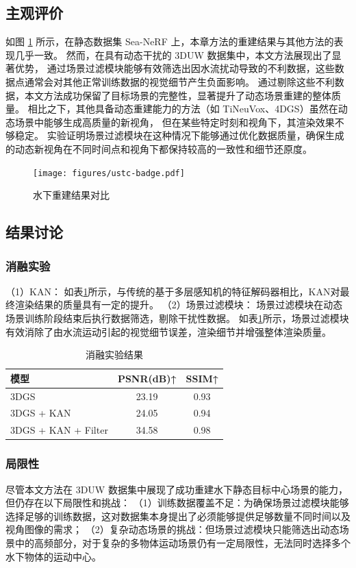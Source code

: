 \subsection{主观评价}
如图 \ref{img:res_3duw} 所示，在静态数据集 Sea-NeRF 上，本章方法的重建结果与其他方法的表现几乎一致。
然而，在具有动态干扰的 3DUW 数据集中，本文方法展现出了显著优势，
通过场景过滤模块能够有效筛选出因水流扰动导致的不利数据，这些数据点通常会对其他正常训练数据的视觉细节产生负面影响。
通过剔除这些不利数据，本文方法成功保留了目标场景的完整性，显著提升了动态场景重建的整体质量。
相比之下，其他具备动态重建能力的方法（如 TiNeuVox\cite{tineuvox}、4DGS\cite{4DGS}）虽然在动态场景中能够生成高质量的新视角，
但在某些特定时刻和视角下，其渲染效果不够稳定。
实验证明场景过滤模块在这种情况下能够通过优化数据质量，确保生成的动态新视角在不同时间点和视角下都保持较高的一致性和细节还原度。
\begin{figure}[htbp]
    \centering
    \texttt{[image: figures/ustc-badge.pdf]}
    \caption{水下重建结果对比}
    \label{img:res_3duw}
\end{figure}

\subsection{结果讨论}
\subsubsection{消融实验}
（1）KAN：
如表\ref{tab:recon_ablation}所示，与传统的基于多层感知机的特征解码器相比，KAN对最终渲染结果的质量具有一定的提升。
（2）场景过滤模块：
场景过滤模块在动态场景训练阶段结束后执行数据筛选，剔除干扰性数据。
如表\ref{tab:recon_ablation}所示，场景过滤模块有效消除了由水流运动引起的视觉细节误差，渲染细节并增强整体渲染质量。
\begin{table}
    \centering
    \caption{消融实验结果}
    \label{tab:recon_ablation}
    \begin{tabular}{lcc}
        \toprule
        模型 & PSNR(dB)↑ & SSIM↑ \\
        \midrule
        3DGS & 23.19 & 0.93 \\
        3DGS + KAN & 24.05 & 0.94 \\
        3DGS + KAN + Filter & 34.58 & 0.98 \\
        \bottomrule
    \end{tabular}
\end{table}


\subsubsection{局限性}
尽管本文方法在 3DUW 数据集中展现了成功重建水下静态目标中心场景的能力，但仍存在以下局限性和挑战：
（1）训练数据覆盖不足：为确保场景过滤模块能够选择足够的训练数据，这对数据集本身提出了必须能够提供足够数量不同时间以及视角图像的需求；
（2）复杂动态场景的挑战：但场景过滤模块只能筛选出动态场景中的高频部分，对于复杂的多物体运动场景仍有一定局限性，无法同时选择多个水下物体的运动中心。
